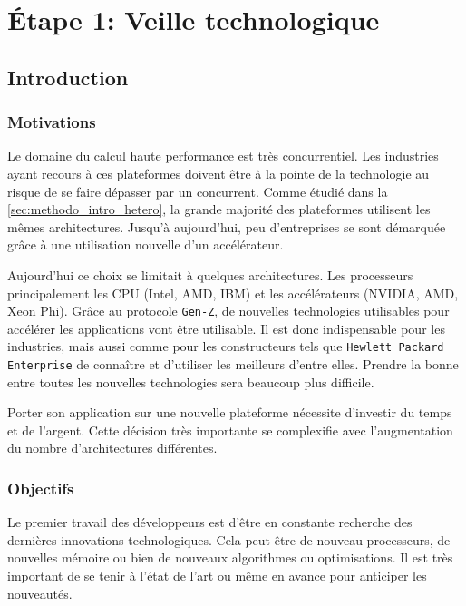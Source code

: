 \section{Étape 1: Veille technologique}\label{sec:methodo_step1}


\subsection{Introduction}
    
    \subsubsection{Motivations}
    
        Le domaine du calcul haute performance est très concurrentiel. Les industries ayant recours à ces plateformes doivent être à la pointe de la technologie au risque de se faire dépasser par un concurrent. 
        Comme étudié dans la \autoref{sec:methodo_intro_hetero}, la grande majorité des plateformes utilisent les mêmes architectures. Jusqu'à aujourd'hui, peu d'entreprises se sont démarquée grâce à une utilisation nouvelle d'un accélérateur.
      
        Aujourd'hui ce choix se limitait à quelques architectures. Les processeurs principalement les CPU (Intel, AMD, IBM) et les accélérateurs (NVIDIA, AMD, Xeon Phi).     Grâce au protocole \verb=Gen-Z=, de nouvelles technologies utilisables pour accélérer les applications vont être utilisable. Il est donc indispensable pour les industries, mais aussi comme pour les constructeurs tels que \verb=Hewlett Packard Enterprise= de connaître et d'utiliser les meilleurs d'entre elles. Prendre la bonne entre toutes les nouvelles technologies sera beaucoup plus difficile.
      
        Porter son application sur une nouvelle plateforme nécessite d'investir du temps et de l'argent. Cette décision très importante se complexifie avec l'augmentation du nombre d'architectures différentes.
   
   \subsubsection{Objectifs}
        
        Le premier travail des développeurs est d'être en constante recherche des dernières innovations technologiques. Cela peut être de nouveau processeurs, de nouvelles mémoire ou bien de nouveaux algorithmes ou optimisations. Il est très important de se tenir à l'état de l'art ou même en avance pour anticiper les nouveautés. 

